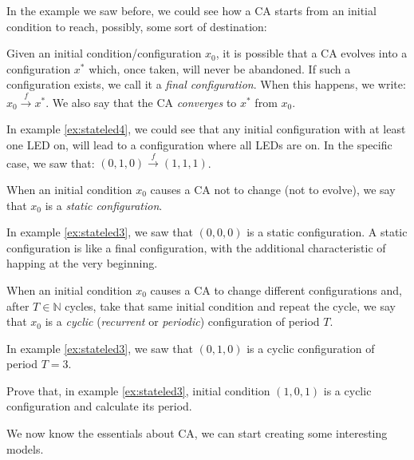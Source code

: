 In the example we saw before, we could see how a CA starts from an initial condition 
to reach, possibly, some sort of destination:

\begin{definition}
\label{def:finalconf}
Given an initial condition/configuration $x_0$, 
it is possible that a CA evolves into a configuration
$x^\ast$ which, once taken, will never be abandoned. If such a configuration exists, we call it
a \textit{final configuration}. When this happens, we write:
$x_0 \overset{f}{\rightarrow} x^\ast$.
We also say that the CA \textit{converges} to $x^\ast$ from $x_0$.
\end{definition}

In example \ref{ex:stateled4}, we could see that any initial configuration with at least one
LED on, will lead to a configuration where all LEDs are on. In the specific case, we saw that:
$(0,1,0) \overset{f}{\rightarrow} (1,1,1)$.

\begin{definition}
\label{def:staticconf}
When an initial condition $x_0$ causes a CA not to change (not to evolve), we say that
$x_0$ is a \textit{static configuration}.
\end{definition}

In example \ref{ex:stateled3}, we saw that $(0,0,0)$ is a static configuration.
A static configuration is like a final configuration, with the additional characteristic
of happing at the very beginning.

\begin{definition}
\label{def:recconf}
When an initial condition $x_0$ causes a CA to change different configurations and, after
$T \in \mathbb{N}$ cycles, take that same initial condition and repeat the cycle, we say
that $x_0$ is a \textit{cyclic} (\textit{recurrent} or \textit{periodic}) configuration of period $T$.
\end{definition}

In example \ref{ex:stateled3}, we saw that $(0,1,0)$ is a cyclic configuration of period $T=3$.

\begin{problem}
\label{prob:testcyclic}
Prove that, in example \ref{ex:stateled3}, initial condition $(1,0,1)$ is a cyclic configuration
and calculate its period.
\end{problem}

We now know the essentials about CA, we can start creating some interesting models.
